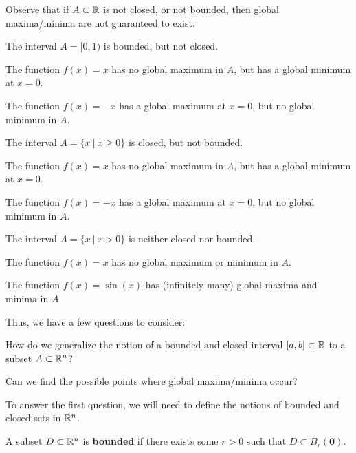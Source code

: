     \begin{remark}
    Observe that if $A \subset \mathbb{R}$ is not closed, or not bounded, then global maxima/minima are not guaranteed to exist.
    \end{remark}

    \begin{example}
    The interval $A = [0,1)$ is bounded, but not closed.  
    
    The function $f(x) = x$ has no global maximum in $A$, but has a global minimum at $x=0$.

    The function $f(x) = -x$ has a global maximum at $x=0$, but no global minimum in $A$.
    \end{example}

    \begin{example}
     The interval $A = \{x \ | \ x \geq 0 \}$ is closed, but not bounded.   
        
    The function $f(x) = x$ has no global maximum in $A$, but has a global minimum at $x=0$.

    The function $f(x) = -x$ has a global maximum at $x=0$, but no global minimum in $A$.
    \end{example}

    
    \begin{example}
     The interval $A = \{x \ | \ x > 0 \}$ is neither closed nor bounded.   
        
    The function $f(x) = x$ has no global maximum or minimum in $A$.

    The function $f(x) = \sin(x)$ has (infinitely many) global maxima and minima in $A$.
    \end{example}

Thus, we have a few questions to consider:

    \begin{motivating}
How do we generalize the notion of a bounded and closed interval $[a,b] \subset \mathbb{R}$ to a subset $A \subset \mathbb{R}^n$?
\end{motivating}

\begin{motivating}
    Can we find the possible points where global maxima/minima occur?
\end{motivating}

To answer the first question, we will need to define the notions of bounded and closed sets in $\mathbb{R}^n$.

\begin{definition}
A subset $D \subset \mathbb{R}^n$ is \textbf{bounded} if there exists some $r > 0$ such that $D \subset B_r(\bm{0})$.
\end{definition}

